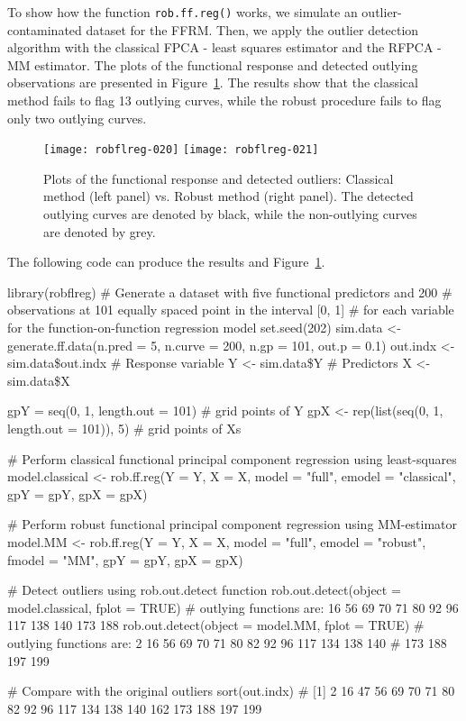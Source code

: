 To show how the function \texttt{rob.ff.reg()} works, we simulate an outlier-contaminated dataset for the FFRM. Then, we apply the outlier detection algorithm with the classical FPCA - least squares estimator and the RFPCA - MM estimator. The plots of the functional response and detected outlying observations are presented in Figure~\ref{fig:6}. The results show that the classical method fails to flag 13 outlying curves, while the robust procedure fails to flag only two outlying curves. 
\begin{figure}[!htb]
  \begin{center}
\texttt{[image: robflreg-020]}
\texttt{[image: robflreg-021]}
\end{center}
\caption{Plots of the functional response and detected outliers: Classical method (left panel) vs. Robust method (right panel). The detected outlying curves are denoted by black, while the non-outlying curves are denoted by grey.}\label{fig:6}
\end{figure}

The following code can produce the results and Figure~\ref{fig:6}.
\begin{smallexample}
\begin{smallverbatim}
library(robflreg)
# Generate a dataset with five functional predictors and 200
# observations at 101 equally spaced point in the interval [0, 1]
# for each variable for the function-on-function regression model
set.seed(202)
sim.data <- generate.ff.data(n.pred = 5, n.curve = 200, n.gp = 101, out.p = 0.1)
out.indx <- sim.data\$out.indx
# Response variable
Y <- sim.data\$Y
# Predictors
X <- sim.data\$X

gpY = seq(0, 1, length.out = 101) # grid points of Y
gpX <- rep(list(seq(0, 1, length.out = 101)), 5) # grid points of Xs

# Perform classical functional principal component regression using least-squares
model.classical <- rob.ff.reg(Y = Y, X = X, model = "full", emodel = "classical",
                              gpY = gpY, gpX = gpX)

# Perform robust functional principal component regression using MM-estimator
model.MM <- rob.ff.reg(Y = Y, X = X, model = "full", emodel = "robust", fmodel = "MM",
                       gpY = gpY, gpX = gpX)

# Detect outliers using rob.out.detect function
rob.out.detect(object = model.classical, fplot = TRUE)
# outlying functions are: 16 56 69 70 71 80 92 96 117 138 140 173 188
rob.out.detect(object = model.MM, fplot = TRUE)
# outlying functions are: 2 16 56 69 70 71 80 82 92 96 117 134 138 140 
# 173 188 197 199

# Compare with the original outliers
sort(out.indx)
# [1] 2 16 47 56 69 70 71 80 82 92 96 117 134 138 140 162 173 188 197 199
\end{smallverbatim}
\end{smallexample}


